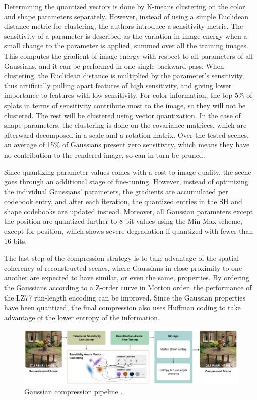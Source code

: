 Determining the quantized vectors is done by K-means clustering on the color and shape parameters separately. However, instead of using a simple Euclidean distance metric for clustering, the authors introduce a sensitivity metric.  The sensitivity of a parameter is described as the variation in image energy when a small change to the parameter is applied, summed over all the training images. This computes the gradient of image energy with respect to all parameters of all Gaussians, and it can be performed in one single backward pass. When clustering, the Euclidean distance is multiplied by the parameter's sensitivity, thus artificially pulling apart features of high sensitivity, and giving lower importance to features with low sensitivity. For color information, the top 5\% of splats in terms of sensitivity contribute most to the image, so they will not be clustered. The rest will be clustered using vector quantization. In the case of shape parameters, the clustering is done on the covariance matrices, which are afterward decomposed in a scale and a rotation matrix. Over the tested scenes, an average of 15\% of Gaussians present zero sensitivity, which means they have no contribution to the rendered image, so can in turn be pruned. 

Since quantizing parameter values comes with a cost to image quality, the scene goes through an additional stage of fine-tuning. However, instead of optimizing the individual Gaussians' parameters, the gradients are accumulated per codebook entry, and after each iteration, the quantized entries in the SH and shape codebooks are updated instead. Moreover, all Gaussian parameters except the position are quantized further to 8-bit values using the Min-Max scheme, except for position, which shows severe degradation if quantized with fewer than 16 bits. 

The last step of the compression strategy is to take advantage of the spatial coherency of reconstructed scenes, where Gaussians in close proximity to one another are expected to have similar, or even the same, properties. By ordering the Gaussians according to a Z-order curve in Morton order, the performance of the LZ77 run-length encoding can be improved. Since the Gaussian properties have been quantized, the final compression also uses Huffman coding to take advantage of the lower entropy of the information.

\begin{figure}[H]
    \centering
    \includegraphics[width=0.8\linewidth]{figures/compression.png}
    \caption{Gaussian compression pipeline \cite{Niedermayr_2024_CVPR}.}
    \label{fig:compression}
\end{figure}


